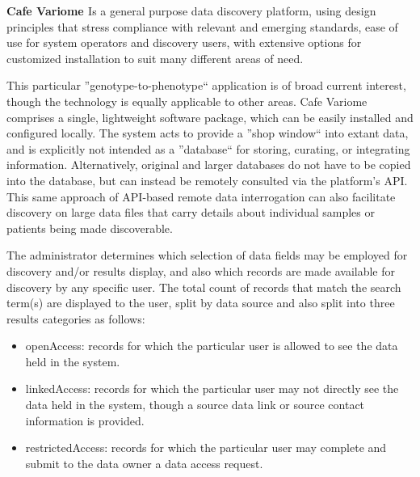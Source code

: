 \textbf{Cafe Variome \cite{cafevariome}}
Is a general purpose data discovery platform, using design principles that stress
compliance with relevant and emerging standards, ease of use for system operators and
discovery users, with extensive options for customized installation to suit many
different areas of need.

This particular ''genotype-to-phenotype`` application is of broad current interest,
though the technology is equally applicable to other areas.
Cafe Variome comprises a single, lightweight software package, which can be easily
installed and configured locally.
The system acts to provide a ''shop window`` into extant data, and is explicitly not
intended as a ''database`` for storing, curating, or integrating information.
Alternatively, original and larger databases do not have to be copied into the
database, but can instead be remotely consulted via the platform’s API.
This same approach of API-based remote data interrogation can also facilitate discovery
on large data files that carry details about individual samples or patients being made
discoverable.

The administrator determines which selection of data fields may be employed for
discovery and/or results display, and also which records are made available for
discovery by any specific user.
The total count of records that match the search term(s) are displayed to the user,
split by data source and also split into three results categories as follows:
\begin{itemize}
    \item openAccess: records for which the particular user is allowed to see the data
        held in the system.
    \item linkedAccess: records for which the particular user may not directly see the
        data held in the system, though a source data link or source contact
        information is provided.
    \item restrictedAccess: records for which the particular user may complete and
        submit to the data owner a data access request.
\end{itemize}


